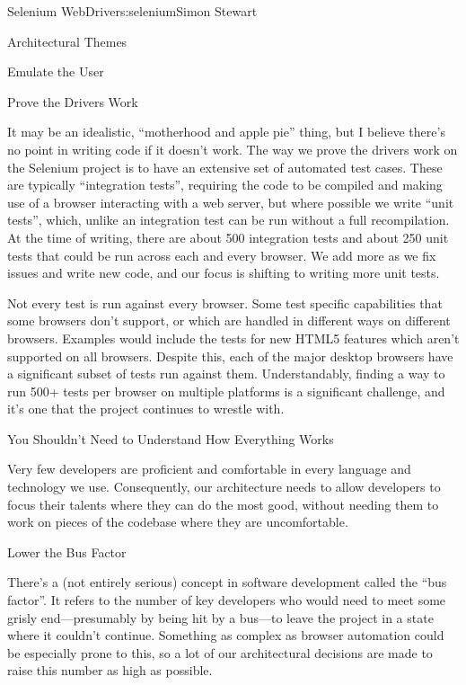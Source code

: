\begin{aosachapter}{Selenium WebDriver}{s:selenium}{Simon Stewart}
\begin{aosasect1}{Architectural Themes}
\begin{aosasect2}{Emulate the User}
\end{aosasect2}

\begin{aosasect2}{Prove the Drivers Work}

It may be an idealistic, ``motherhood and apple pie'' thing, but I
believe there's no point in writing code if it doesn't work. The way
we prove the drivers work on the Selenium project is to have an
extensive set of automated test cases. These are typically
``integration tests'', requiring the code to be compiled and making
use of a browser interacting with a web server, but where possible we
write ``unit tests'', which, unlike an integration test can be run
without a full recompilation. At the time of writing, there are about
500 integration tests and about 250 unit tests that could be run
across each and every browser. We add more as we fix issues and write
new code, and our focus is shifting to writing more unit tests.

Not every test is run against every browser. Some test specific
capabilities that some browsers don't support, or which are handled in
different ways on different browsers. Examples would include the tests
for new HTML5 features which aren't supported on all browsers. Despite
this, each of the major desktop browsers have a significant subset of
tests run against them. Understandably, finding a way to run 500+
tests per browser on multiple platforms is a significant challenge,
and it's one that the project continues to wrestle with.

\end{aosasect2}

\begin{aosasect2}{You Shouldn't Need to Understand How Everything Works}

Very few developers are proficient and comfortable in every language
and technology we use. Consequently, our architecture needs to allow
developers to focus their talents where they can do the most good,
without needing them to work on pieces of the codebase where they are
uncomfortable.

\end{aosasect2}

\begin{aosasect2}{Lower the Bus Factor}

There's a (not entirely serious) concept in software development
called the ``bus factor''. It refers to the number of key developers
who would need to meet some grisly end---presumably by being hit by a
bus---to leave the project in a state where it couldn't
continue. Something as complex as browser automation could be
especially prone to this, so a lot of our architectural decisions are
made to raise this number as high as possible.


\end{aosasect2}
\end{aosasect1}
\end{aosachapter}
